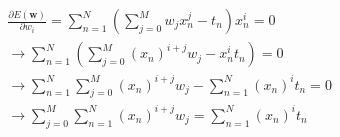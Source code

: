 $$
\begin{aligned}
  &\frac{\partial E(\mathbf{w})}{\partial w_i} = \sum_{n = 1}^N(\sum^M_{j=0}w_jx_n^j - t_n)x_n^i = 0\\
  &\rightarrow \sum^N_{n=1}(\sum^M_{j=0}(x_n)^{i+j}w_j - x_n^it_n) = 0\\
  &\rightarrow \sum^N_{n=1}\sum^M_{j=0}(x_n)^{i+j}w_j - \sum^N_{n=1}(x_n)^it_n = 0\\
  &\rightarrow \sum^M_{j = 0}\sum^N_{n=1}(x_n)^{i+j}w_j = \sum^N_{n=1}(x_n)^it_n
\end{aligned}
$$
